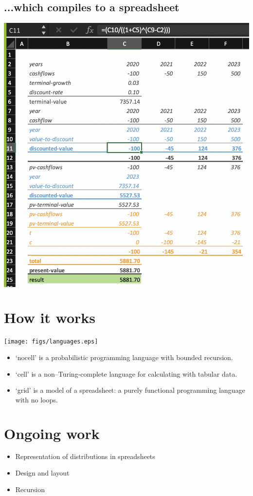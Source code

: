 \documentclass[twocolumn, 12pt]{article}
\begin{document}
\subsection*{...which compiles to a spreadsheet}
\begin{center}
\includegraphics[width=0.75\columnwidth]{figs/ss.png}
\end{center}

\section*{How it works}
\begin{center}
\texttt{[image: figs/languages.eps]}
\end{center}
\begin{itemize}[itemsep=0.4ex]
\item ‘nocell’ is a probabilistic programming language with bounded recursion.
\item ‘cell’ is a non--Turing-complete language for calculating with tabular
  data.
\item ‘grid’ is a model of a spreadsheet: a purely functional programming language with no loops.
\end{itemize}

\section*{Ongoing work}
\begin{itemize}[nosep]
\item Representation of distributions in spreadsheets
\item Design and layout
\item Recursion
\end{itemize}
  
\end{document}
